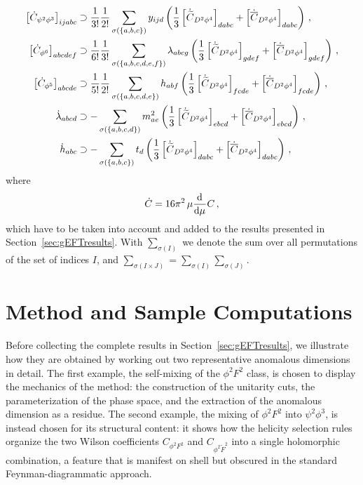 \begin{align}
    \left[\dot C_{\psi^2\phi^3}\right]_{ijabc} &\supset \frac{1}{3!}\frac{1}{2!}\sum_{\sigma(\{a,b,c\})}y_{ijd} \left(
    \frac{1}{3}\left[\dot{\widetilde{C}}_{D^2\phi^4}\right]_{dabc}+\left[\dot{\overline C}_{D^2\phi^4}\right]_{dabc}
    \right)\,,\label{eq:psi2phi3<-Ctildeandbar}\\
    \left[\dot C_{\phi^6}\right]_{abcdef} &\supset \frac{1}{6!}\frac{1}{3!}\sum_{\sigma(\{a,b,c,d,e,f\})}\lambda_{abcg}\left(
    \frac{1}{3}\left[\dot{\widetilde{C}}_{D^2\phi^4}\right]_{gdef}+\left[\dot{\overline C}_{D^2\phi^4}\right]_{gdef}
    \right)\,,\label{eq:phi6<-Ctildeandbar}\\
    \left[\dot C_{\phi^5}\right]_{abcde} &\supset \frac{1}{5!}\frac{1}{2!}\sum_{\sigma(\{a,b,c,d,e\})}h_{abf}\left(
    \frac{1}{3}\left[\dot{\widetilde{C}}_{D^2\phi^4}\right]_{fcde}+\left[\dot{\overline C}_{D^2\phi^4}\right]_{fcde}
    \right)\,,\label{eq:phi5<-Ctildeandbar}\\
    \dot \lambda_{abcd} &\supset - \sum_{\sigma(\{a,b,c,d\})}m^2_{ae}\left(
    \frac{1}{3}\left[\dot{\widetilde{C}}_{D^2\phi^4}\right]_{ebcd}+\left[\dot{\overline C}_{D^2\phi^4}\right]_{ebcd}
    \right)\,,\label{eq:phi4<-Ctildeandbar}\\
    \dot h_{abc} &\supset -  \sum_{\sigma(\{a,b,c\})} t_d \left(
    \frac{1}{3}\left[\dot{\widetilde{C}}_{D^2\phi^4}\right]_{dabc}+\left[\dot{\overline C}_{D^2\phi^4}\right]_{dabc}
    \right)\,,\label{eq:phi3<-Ctildeandbar}
\end{align}
where
\begin{equation}
    \dot C = 16\pi^2\,\mu \dv[]{}{\mu}C\,,
\end{equation}
which have to be taken into account and added to the results presented in Section~\ref{sec:gEFTresults}.
With $\sum_{\sigma(I)}$ we denote the sum over all permutations of the set of indices $I$, and $\sum_{\sigma(I\times J)} = \sum_{\sigma(I)}\sum_{\sigma(J)}$.

\section{Method and Sample Computations}
\label{sec:gEFTexamples}

Before collecting the complete results in Section~\ref{sec:gEFTresults}, we illustrate how
they are obtained by working out two representative anomalous dimensions in detail.
The first example, the self-mixing of the $\phi^2F^2$ class, is chosen to display the
mechanics of the method: the construction of the unitarity cuts, the parameterization of the
phase space, and the extraction of the anomalous dimension as a residue.
The second example, the mixing of $\phi^2F^2$ into $\psi^2\phi^3$, is instead chosen for its
structural content: it shows how the helicity selection rules \cite{Cheung:2015aba} organize the two Wilson
coefficients $C_{\phi^2F^2}$ and $C_{\phi^2\widetilde F^2}$ into a single holomorphic
combination, a feature that is manifest on shell but obscured in the standard
Feynman-diagrammatic approach.

